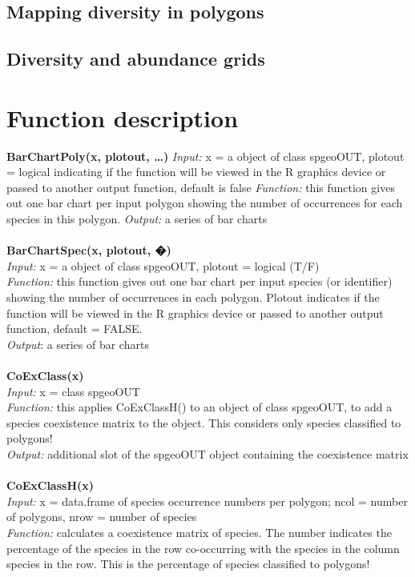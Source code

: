 \documentclass[a4paper,titlepage,11pt]{scrreprt}
\begin{document}
\section{Mapping diversity in polygons}
\section{Diversity and abundance grids}

\chapter{Function description} \label{functions}
\textbf{BarChartPoly(x, plotout, \dots)}
\textit{Input:} x = a object of class spgeoOUT, plotout = logical indicating if the function will be viewed in the R graphics device or passed to another output function, default is false
\textit{Function:} this function gives out one bar chart per input polygon showing the number of occurrences for each species in this polygon.
\textit{Output:} a series of bar charts\\
\\
\textbf{BarChartSpec(x, plotout, �)}\\
\textit{Input:} x = a object of class spgeoOUT, plotout = logical (T/F)\\
\textit{Function:} this function gives out one bar chart per input species (or identifier) showing the number of occurrences in each polygon. Plotout indicates if the function will be viewed in the R graphics device or passed to another output function, default = FALSE.\\
\textit{Output}: a series of bar charts\\
\\
\textbf{CoExClass(x)}\\
\textit{Input:} x = class spgeoOUT\\
\textit{Function:} this applies CoExClassH() to an object of class spgeoOUT, to add a species coexistence matrix to the object. This considers only species classified to polygons!\\
\textit{Output:} additional slot of the spgeoOUT object containing the coexistence matrix\\
\\
\textbf{CoExClassH(x)}\\
\textit{Input:} x = data.frame of species occurrence numbers per polygon; ncol = number of polygons, nrow = number of species\\
\textit{Function:} calculates a coexistence matrix of species. The number indicates the percentage of the species in the row co-occurring with the species in the column species in the row. This is the percentage of species classified to polygons!\\
\end{document}
